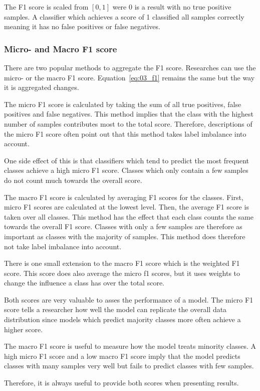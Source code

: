 The F1 score is scaled from $[0, 1]$ were 0 is a result with no true positive samples. A classifier which achieves a score of 1 classified all samples correctly meaning it has no false positives or false negatives.

\subsubsection*{Micro- and Macro F1 score}

There are two popular methods to aggregate the F1 score. Researches can use the micro- or the macro F1 score. Equation~\ref{eq:03_f1} remains the same but the way it is aggregated changes. 
\medskip

The micro F1 score is calculated by taking the sum of all true positives, false positives and false negatives. This method implies that the class with the highest number of samples contributes most to the total score. Therefore, descriptions of the micro F1 score often point out that this method takes label imbalance into account. 

One side effect of this is that classifiers which tend to predict the most frequent classes achieve a high micro F1 score. Classes which only contain a few samples do not count much towards the overall score.
\bigskip

The macro F1 score is calculated by averaging F1 scores for the classes. First, micro F1 scores are calculated at the lowest level. Then, the average F1 score is taken over all classes. This method has the effect that each class counts the same towards the overall F1 score. Classes with only a few samples are therefore as important as classes with the majority of samples. This method does therefore not take label imbalance into account.
\medskip

There is one small extension to the macro F1 score which is the weighted F1 score. This score does also average the micro f1 scores, but it uses weights to change the influence a class has over the total score.
\bigskip

Both scores are very valuable to asses the performance of a model. The micro F1 score tells a researcher how well the model can replicate the overall data distribution since models which predict majority classes more often achieve a higher score. 
\medskip

The macro F1 score is useful to measure how the model treats minority classes. A high micro F1 score and a low macro F1 score imply that the model predicts classes with many samples very well but fails to predict classes with few samples.

Therefore, it is always useful to provide both scores when presenting results.